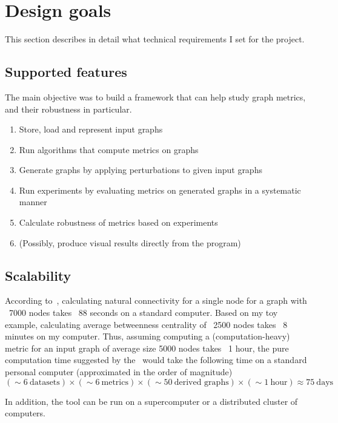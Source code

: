 \section{Design goals}\label{sec:design-goals}

This section describes in detail what technical requirements I set for the project.


\subsection{Supported features}

The main objective was to build a framework that can help study graph metrics, and their robustness in particular.


\begin{enumerate}
    \item Store, load and represent input graphs
    \item Run algorithms that compute metrics on graphs
    \item Generate graphs by applying perturbations to given input graphs
    \item Run experiments by evaluating metrics on generated graphs in a systematic manner
    \item Calculate robustness of metrics based on experiments
    \item (Possibly, produce visual results directly from the program)
\end{enumerate}


\subsection{Scalability}

According to~\cite{Bozhilova2019}, calculating natural connectivity for a single node for a graph with ~7000 nodes takes ~88 seconds on a standard computer.
Based on my toy example, calculating average betweenness centrality of ~2500 nodes takes ~8 minutes on my computer.
Thus, assuming computing a (computation-heavy) metric for an input graph of average size 5000 nodes takes ~1 hour, the pure computation time suggested by the~ would take the following time on a standard personal computer (approximated in the order of magnitude)
\[(\sim 6\ \text{datasets}) \times (\sim 6\ \text{metrics}) \times (\sim 50\ \text{derived graphs}) \times (\sim 1\ \text{hour}) \approx 75\ \text{days}\]


In addition, the tool can be run on a supercomputer or a distributed cluster of computers.



